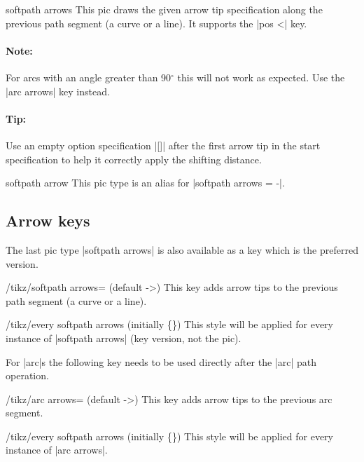 \begin{multicols}{2}
\begin{pictype}{softpath arrows}{}
  This pic draws the given arrow tip specification along the previous path segment (a curve or a line).
  It supports the |pos <| key.
  
  \paragraph{Note:} For arcs with an angle greater than 90${}^\circ$
    this will not work as expected. Use the |arc arrows| key instead.
  \paragraph{Tip:}
  Use an empty option specification |[]| after the first arrow tip in the start specification
  to help it correctly apply the shifting distance.
\end{pictype}
\begin{pictype}{softpath arrow}{}
  This pic type is an alias for |softpath arrows = -|.
\end{pictype}

\subsection{Arrow keys}
The last pic type |softpath arrows| is also available as a key
which is the preferred version.
\begin{key}{/tikz/softpath arrows= (default ->)}
This key adds arrow tips to the previous path segment (a curve or a line).

\begin{stylekey}{/tikz/every softpath arrows (initially \{\})}
This style will be applied for every instance of |softpath arrows| (key version, not the pic).
\end{stylekey}
\end{key}

For |arc|s the following key needs to be used directly after the |arc| path operation.
\begin{key}{/tikz/arc arrows= (default ->)}
This key adds arrow tips to the previous arc segment.
\begin{stylekey}{/tikz/every softpath arrows (initially \{\})}
This style will be applied for every instance of |arc arrows|.
\end{stylekey}


\end{key}
\end{multicols}
